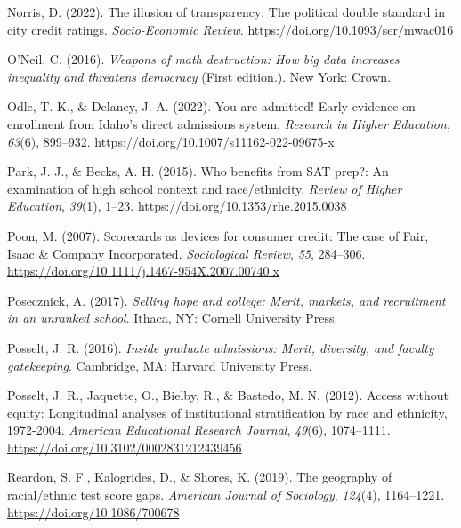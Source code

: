 \documentclass[
  12pt,
]{article}
\newlength{\cslhangindent}
\newlength{\cslentryspacingunit} %
\newenvironment{CSLReferences}[2] %
 {%
  \setlength{\parindent}{0pt}
  \ifodd #1
  \let\oldpar\par
  \def\par{\hangindent=\cslhangindent\oldpar}
  \fi
  \setlength{\parskip}{#2\cslentryspacingunit}
 }%
 {}
\begin{document}
\begin{CSLReferences}{1}{0}
\leavevmode{}%
Norris, D. (2022). The illusion of transparency: The political double standard in city credit ratings. \emph{Socio-Economic Review}. \url{https://doi.org/10.1093/ser/mwac016}

\leavevmode{}%
O'Neil, C. (2016). \emph{Weapons of math destruction: How big data increases inequality and threatens democracy} (First edition.). New York: Crown.

\leavevmode{}%
Odle, T. K., \& Delaney, J. A. (2022). You are admitted! Early evidence on enrollment from {Idaho's} direct admissions system. \emph{Research in Higher Education}, \emph{63}(6), 899--932. \url{https://doi.org/10.1007/s11162-022-09675-x}

\leavevmode{}%
Park, J. J., \& Becks, A. H. (2015). Who benefits from SAT prep?: An examination of high school context and race/ethnicity. \emph{Review of Higher Education}, \emph{39}(1), 1--23. \url{https://doi.org/10.1353/rhe.2015.0038}

\leavevmode{}%
Poon, M. (2007). Scorecards as devices for consumer credit: The case of {Fair, Isaac \& Company Incorporated}. \emph{Sociological Review}, \emph{55}, 284--306. \url{https://doi.org/10.1111/j.1467-954X.2007.00740.x}

\leavevmode{}%
Posecznick, A. (2017). \emph{Selling hope and college: Merit, markets, and recruitment in an unranked school}. Ithaca, NY: Cornell University Press.

\leavevmode{}%
Posselt, J. R. (2016). \emph{Inside graduate admissions: Merit, diversity, and faculty gatekeeping}. Cambridge, MA: Harvard University Press.

\leavevmode{}%
Posselt, J. R., Jaquette, O., Bielby, R., \& Bastedo, M. N. (2012). Access without equity: Longitudinal analyses of institutional stratification by race and ethnicity, 1972-2004. \emph{American Educational Research Journal}, \emph{49}(6), 1074--1111. \url{https://doi.org/10.3102/0002831212439456}

\leavevmode{}%
Reardon, S. F., Kalogrides, D., \& Shores, K. (2019). The geography of racial/ethnic test score gaps. \emph{American Journal of Sociology}, \emph{124}(4), 1164--1221. \url{https://doi.org/10.1086/700678}


\end{CSLReferences}
\end{document}
